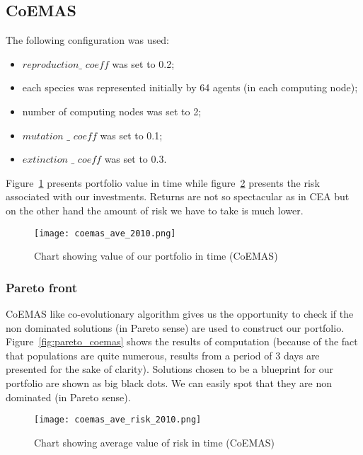 \subsection{CoEMAS}

The following configuration was used:
\begin{itemize}
  \item $reproduction\_$ $coeff$ was set to 0.2;
  \item each species was represented initially by 64 agents (in each computing node);
  \item number of computing nodes was set to 2;
  \item $mutation$ $\_$ $coeff$ was set to 0.1;
  \item $extinction$ $\_$ $coeff$ was set to 0.3.
\end{itemize}

Figure~\ref{fig:agent_return} presents portfolio value in time while  figure~\ref{fig:agent_risk} presents the risk associated with our investments.
Returns are not so spectacular as in CEA but on the other hand the amount of risk we have to take is much lower.

\begin{figure}[ht]
  \begin{center}
    \texttt{[image: coemas\_ave\_2010.png]}
  \end{center}
  \caption{Chart showing value of our portfolio in time (CoEMAS)}
  \label{fig:agent_return}
\end{figure}

\subsubsection{Pareto front}

CoEMAS like co-evolutionary algorithm gives us the opportunity to check if the non dominated solutions (in Pareto sense) are used to construct our portfolio.
Figure~\ref{fig:pareto_coemas} shows the results of computation (because of the fact that populations are quite numerous,
 results from a period of 3 days are presented for the sake of clarity). 
Solutions chosen to be a blueprint for our portfolio are shown as big black dots.
We can easily spot that they are non dominated (in Pareto sense). 

\begin{figure}[ht]
  \begin{center}
    \texttt{[image: coemas\_ave\_risk\_2010.png]}
  \end{center}
  \caption{Chart showing average value of risk in time (CoEMAS)}
  \label{fig:agent_risk}
\end{figure}


